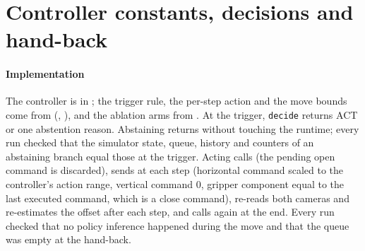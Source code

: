 \section{Controller constants, decisions and hand-back}\label{sec:s-constants}

\paragraph{Implementation} The controller is  in ; the trigger rule, the per-step action and the move bounds come from  (, ), and the ablation arms from . At the trigger, \texttt{decide} returns ACT or one abstention reason. Abstaining returns without touching the runtime; every run checked that the simulator state, queue, history and counters of an abstaining branch equal those at the trigger. Acting calls  (the pending open command is discarded), sends  at each step (horizontal command scaled to the controller's action range, vertical command 0, gripper component equal to the last executed command, which is a close command), re-reads both cameras and re-estimates the offset after each step, and calls  again at the end. Every run checked that no policy inference happened during the move and that the queue was empty at the hand-back.

